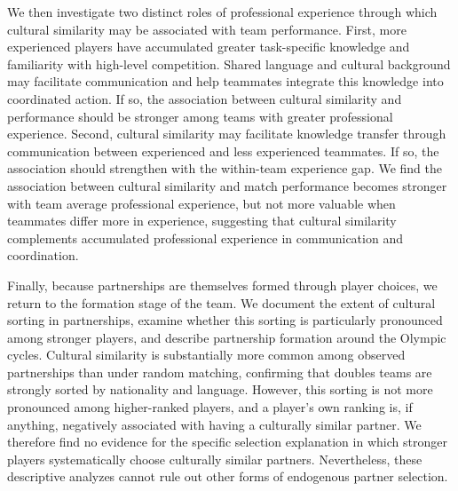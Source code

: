 \documentclass[10pt]{article}
\begin{document}
We then investigate two distinct roles of professional experience through which cultural similarity may be associated with team performance. %
First, more experienced players have accumulated greater task-specific knowledge and familiarity with high-level competition. Shared language and cultural background may facilitate communication and help teammates integrate this knowledge into coordinated action. If so, the association between cultural similarity and performance should be stronger among teams with greater professional experience. Second, cultural similarity may facilitate knowledge transfer through communication between experienced and less experienced teammates. If so, the association should strengthen with the within-team experience gap. We find the association between cultural similarity and match performance becomes stronger with team average professional experience, but not more valuable when teammates differ more in experience, suggesting that cultural similarity complements accumulated professional experience in communication and coordination.

Finally, because partnerships are themselves formed through player choices, we return to the formation stage of the team. We document the extent of cultural sorting in partnerships, examine whether this sorting is particularly pronounced among stronger players, and describe partnership formation around the Olympic cycles. Cultural similarity is substantially more common among observed partnerships than under random matching, confirming that doubles teams are strongly sorted by nationality and language. However, this sorting is not more pronounced among higher-ranked players, and a player's own ranking is, if anything, negatively associated with having a culturally similar partner. We therefore find no evidence for the specific selection explanation in which stronger players systematically choose culturally similar partners. Nevertheless, these descriptive analyzes cannot rule out other forms of endogenous partner selection.
\end{document}

